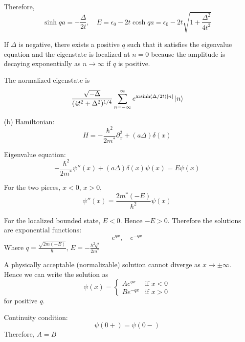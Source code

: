 \documentclass[a4paper,11pt]{article}
\begin{document}
Therefore,
\begin{equation}
    \sinh qa = -\frac{\Delta}{2t},\quad E = \epsilon_0-2t\cosh qa = \epsilon_0-2t\sqrt{1+\frac{\Delta^2}{4t^2}}
\end{equation}

If $\Delta$ is negative, there exists a positive $q$ such that it satisfies the eigenvalue equation and the eigenstate is localized at $n=0$ because the amplitude is decaying exponentially as $n\rightarrow \infty$ if $q$ is positive.

The normalized eigenstate is
\begin{equation}
    \frac{\sqrt{-\Delta}}{(4t^2+\Delta^2)^{1/4}}\sum_{n=-\infty}^{\infty}e^{\operatorname{arsinh}(\Delta/2t)|n|}\ket{n}
\end{equation}

(b) Hamiltonian:
\begin{equation}
    H = -\frac{\hbar^2}{2m^*}\partial_x^2 +(a\Delta)\delta(x)
\end{equation}

Eigenvalue equation:
\begin{equation}
    -\frac{\hbar^2}{2m^*}\psi''(x) +(a\Delta)\delta(x)\psi(x) = E\psi(x)
\end{equation}

For the two pieces, $x<0$, $x>0$,
\begin{equation}
    \psi''(x)=\frac{2m^* (-E)}{\hbar^2}\psi(x)
\end{equation}

For the localized bounded state, $E<0$. Hence $-E>0$. Therefore the solutions are exponential functions:
\begin{equation}
    e^{qx},\quad e^{-qx}
\end{equation}
Where $q = \frac{\sqrt{2m(-E)}}{\hbar}$, $E=-\frac{\hbar^2q^2}{2m^*}$

A physically acceptable (normalizable) solution cannot diverge as $x \rightarrow \pm\infty$. Hence we can write the solution as
\begin{equation}
    \psi(x)=\begin{cases}
        Ae^{qx} & \text{if $x < 0$} \\
        Be^{-qx} & \text{if $x > 0$}
    \end{cases}
\end{equation}
for positive $q$.

Continuity condition:
\begin{equation}
    \psi(0+)=\psi(0-)
\end{equation}
Therefore, $A=B$
\end{document}
